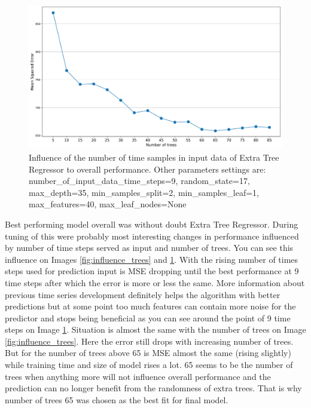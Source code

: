 \documentclass{article}
\begin{document}
\begin{figure}[h!]
\centering
\includegraphics[width=16cm]{imgs/trees_vs_mse.png}
\caption{Influence of the number of time samples in input data of Extra Tree Regressor to overall performance. Other parameters settings are: number\_of\_input\_data\_time\_steps=9, random\_state=17, max\_depth=35, min\_samples\_split=2, min\_samples\_leaf=1, max\_features=40, max\_leaf\_nodes=None}
\label{fig:influence_ts}
\end{figure}

Best performing model overall was without doubt Extra Tree Regressor. During tuning of this were probably most interesting changes in performance influenced by number of time steps served as input and number of trees. You can see this influence on Images \ref{fig:influence_trees} and \ref{fig:influence_ts}. With the rising number of times steps used for prediction input is MSE dropping until the best performance at 9 time steps after which the error is more or less the same. More information about previous time series development definitely helps the algorithm with better predictions but at some point too much features can contain more noise for the predictor and stops being beneficial as you can see around the point of 9 time steps on Image \ref{fig:influence_ts}. Situation is almost the same with the number of trees on Image \ref{fig:influence_trees}. Here the error still drops with increasing number of trees. But for the number of trees above 65 is MSE almost the same (rising slightly) while training time and size of model rises a lot. 65 seems to be the number of trees when anything more will not influence overall performance and the prediction can no longer benefit from the randomness of extra trees. That is why number of trees 65 was chosen as the best fit for final model.
\end{document}
